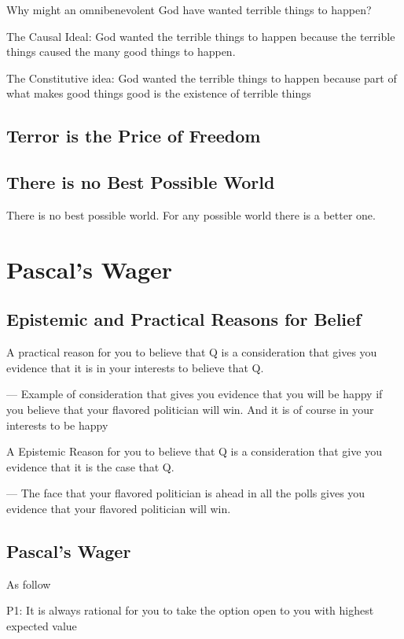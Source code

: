 \documentclass{book}
\begin{document}
Why might an omnibenevolent God have wanted terrible things to happen?

The Causal Ideal: God wanted the terrible things to happen because the terrible things caused the many good things to happen.

The Constitutive idea: God wanted the terrible things to happen because part of what makes good things good is the existence of terrible things

\subsection{Terror is the Price of Freedom}

\subsection{There is no Best Possible World}

There is no best possible world. For any possible world there is a better one.

\section{Pascal's Wager}
\subsection{Epistemic and Practical Reasons for Belief}

A practical reason for you to believe that Q is a consideration that gives you evidence that it is in your interests to believe that Q.

--- Example of consideration that gives you evidence that you will be happy if you believe that your flavored politician will win. And it is of course in your interests to be happy

A Epistemic Reason for you to believe that Q is a consideration that give you evidence that it is the case that Q.

--- The face that your flavored politician is ahead in all the polls gives you evidence that your flavored politician will win.

\subsection{Pascal's Wager}

As follow

P1: It is always rational for you to take the option open to you with highest expected value
\end{document}

